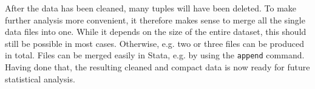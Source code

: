 After the data has been cleaned, many tuples will have been deleted. To make further analysis more convenient, it therefore makes sense to merge all the single data files into one. While it depends on the size of the entire dataset, this should still be possible in most cases. Otherwise, e.g. two or three files can be produced in total. Files can be merged easily in Stata, e.g. by using the \lstinline{append} command. Having done that, the resulting cleaned and compact data is now ready for future statistical analysis. 